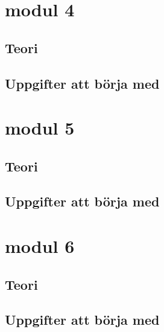 \documentclass{article}
\begin{document}
\section{modul 4}
\subsection{Teori}


\subsection{Uppgifter att börja med}


\section{modul 5}
\subsection{Teori}


\subsection{Uppgifter att börja med}


\section{modul 6}
\subsection{Teori}


\subsection{Uppgifter att börja med}
\end{document}
